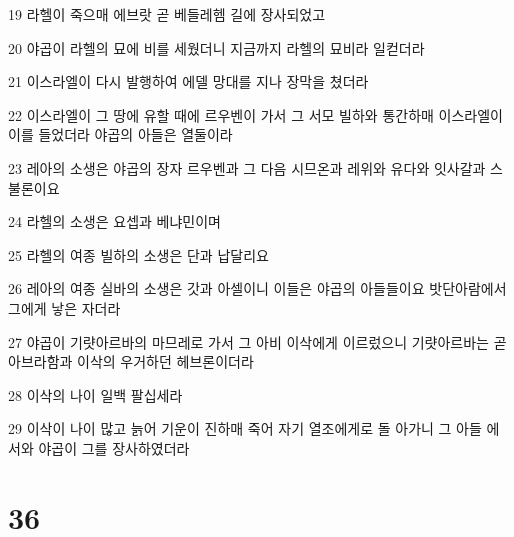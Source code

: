 \par 19 라헬이 죽으매 에브랏 곧 베들레헴 길에 장사되었고
\par 20 야곱이 라헬의 묘에 비를 세웠더니 지금까지 라헬의 묘비라 일컫더라
\par 21 이스라엘이 다시 발행하여 에델 망대를 지나 장막을 쳤더라
\par 22 이스라엘이 그 땅에 유할 때에 르우벤이 가서 그 서모 빌하와 통간하매 이스라엘이 이를 들었더라 야곱의 아들은 열둘이라
\par 23 레아의 소생은 야곱의 장자 르우벤과 그 다음 시므온과 레위와 유다와 잇사갈과 스불론이요
\par 24 라헬의 소생은 요셉과 베냐민이며
\par 25 라헬의 여종 빌하의 소생은 단과 납달리요
\par 26 레아의 여종 실바의 소생은 갓과 아셀이니 이들은 야곱의 아들들이요 밧단아람에서 그에게 낳은 자더라
\par 27 야곱이 기럇아르바의 마므레로 가서 그 아비 이삭에게 이르렀으니 기럇아르바는 곧 아브라함과 이삭의 우거하던 헤브론이더라
\par 28 이삭의 나이 일백 팔십세라
\par 29 이삭이 나이 많고 늙어 기운이 진하매 죽어 자기 열조에게로 돌 아가니 그 아들 에서와 야곱이 그를 장사하였더라

\chapter{36}

